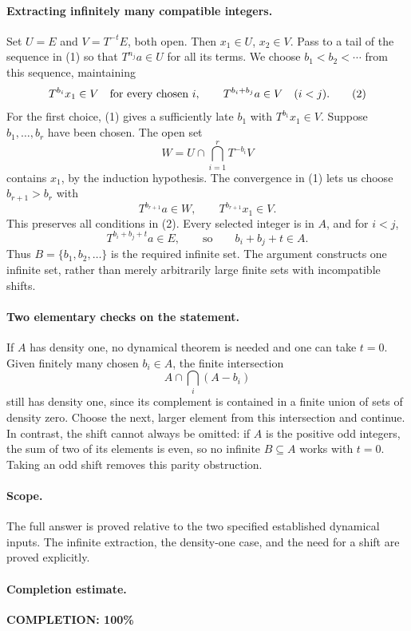 \paragraph{Extracting infinitely many compatible integers.}
Set \(U=E\) and \(V=T^{-t}E\), both open. Then
\(x_1\in U\), \(x_2\in V\).
Pass to a tail of the sequence in (1) so that \(T^{n_j}a\in U\)
for all its terms.
We choose \(b_1<b_2<\cdots\) from this sequence, maintaining
\[
 T^{b_i}x_1\in V\quad\hbox{for every chosen }i,
 \qquad T^{b_i+b_j}a\in V\quad(i<j).
                                                               \tag{2}
\]
For the first choice, (1) gives a sufficiently late \(b_1\)
with \(T^{b_1}x_1\in V\).
Suppose \(b_1,\ldots,b_r\) have been chosen. The open set
\[
 W=U\cap\bigcap_{i=1}^r T^{-b_i}V
\]
contains \(x_1\), by the induction hypothesis.
The convergence in (1) lets us choose \(b_{r+1}>b_r\) with
\[
 T^{b_{r+1}}a\in W,\qquad T^{b_{r+1}}x_1\in V.
\]
This preserves all conditions in (2).
Every selected integer is in \(A\), and for \(i<j\),
\[
 T^{b_i+b_j+t}a\in E,
 \qquad\text{so}\qquad b_i+b_j+t\in A.
\]
Thus \(B=\{b_1,b_2,\ldots\}\) is the required infinite set.
The argument constructs one infinite set, rather than merely
arbitrarily large finite sets with incompatible shifts.

\paragraph{Two elementary checks on the statement.}
If \(A\) has density one, no dynamical theorem is needed and
one can take \(t=0\). Given finitely many chosen \(b_i\in A\),
the finite intersection
\[
 A\cap\bigcap_i(A-b_i)
\]
still has density one, since its complement is contained in a
finite union of sets of density zero. Choose the next, larger
element from this intersection and continue.
In contrast, the shift cannot always be omitted: if \(A\)
is the positive odd integers, the sum of two of its elements
is even, so no infinite \(B\subseteq A\) works with \(t=0\).
Taking an odd shift removes this parity obstruction.

\paragraph{Scope.}
The full answer is proved relative to the two specified established
dynamical inputs. The infinite extraction, the density-one case,
and the need for a shift are proved explicitly.

\paragraph{Completion estimate.}
\textbf{COMPLETION: 100\%}
